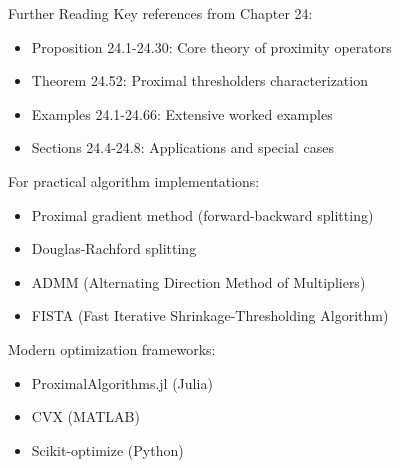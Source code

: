 \documentclass[aspectratio=169,10pt]{beamer}
\begin{document}
\begin{frame}[allowframebreaks]{Further Reading}
Key references from Chapter 24:
\begin{itemize}
    \item Proposition 24.1-24.30: Core theory of proximity operators
    \item Theorem 24.52: Proximal thresholders characterization
    \item Examples 24.1-24.66: Extensive worked examples
    \item Sections 24.4-24.8: Applications and special cases
\end{itemize}

\vspace{0.3cm}

For practical algorithm implementations:
\begin{itemize}
    \item Proximal gradient method (forward-backward splitting)
    \item Douglas-Rachford splitting
    \item ADMM (Alternating Direction Method of Multipliers)
    \item FISTA (Fast Iterative Shrinkage-Thresholding Algorithm)
\end{itemize}

\vspace{0.3cm}

Modern optimization frameworks:
\begin{itemize}
    \item ProximalAlgorithms.jl (Julia)
    \item CVX (MATLAB)
    \item Scikit-optimize (Python)
\end{itemize}
\end{frame}
\end{document}
